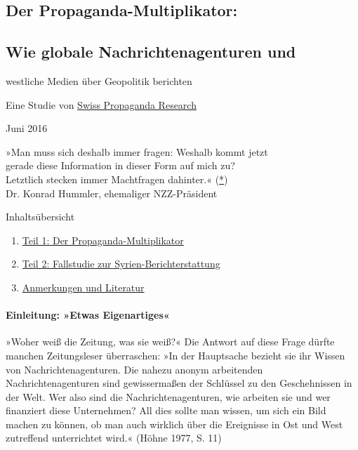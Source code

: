 \hypertarget{der-propaganda-multiplikator-1}{%
\subsection{Der
Propaganda-Multiplikator:}\label{der-propaganda-multiplikator-1}}

\hypertarget{wie-globale-nachrichtenagenturen-und}{%
\subsection{Wie globale Nachrichtenagenturen
und}\label{wie-globale-nachrichtenagenturen-und}}

westliche Medien über Geopolitik berichten

Eine Studie von \href{https://swprs.org/}{Swiss Propaganda Research}

Juni 2016

»Man muss sich deshalb immer fragen: Weshalb kommt jetzt\\
gerade diese Information in dieser Form auf mich zu?\\
Letztlich stecken immer Macht­fragen da­hinter.«
(\href{http://www.nzz.ch/wer-lustvoll-schreibt-der-schreibt-auch-gut-1.11329756}{*})\\
Dr. Konrad Hummler, ehemaliger NZZ-Präsident

Inhaltsübersicht

\begin{enumerate}
\def\labelenumi{\arabic{enumi}.}
\tightlist
\item
  \protect\hyperlink{k1}{Teil 1: Der Propaganda-Multiplikator}
\item
  \protect\hyperlink{k2}{Teil 2: Fallstudie zur
  Syrien-Berichterstattung}
\item
  \protect\hyperlink{k3}{Anmerkungen und Literatur}
\end{enumerate}

\hypertarget{einleitung-etwas-eigenartiges}{%
\paragraph{Einleitung: »Etwas
Eigenartiges«}\label{einleitung-etwas-eigenartiges}}

»Woher weiß die Zeitung, was sie weiß?« Die Antwort auf diese Frage
dürfte manchen Zeitungsleser überraschen: »In der Hauptsache bezieht sie
ihr Wissen von Nachrichtenagenturen. Die nahezu anonym arbeitenden
Nachrichtenagenturen sind gewissermaßen der Schlüssel zu den
Ge­scheh­nissen in der Welt. Wer also sind die Nachrichtenagenturen, wie
arbeiten sie und wer finanziert diese Unternehmen? All dies sollte man
wissen, um sich ein Bild machen zu können, ob man auch wirklich über die
Ereignisse in Ost und West zutreffend unterrichtet wird.« (Höhne 1977,
S. 11)

